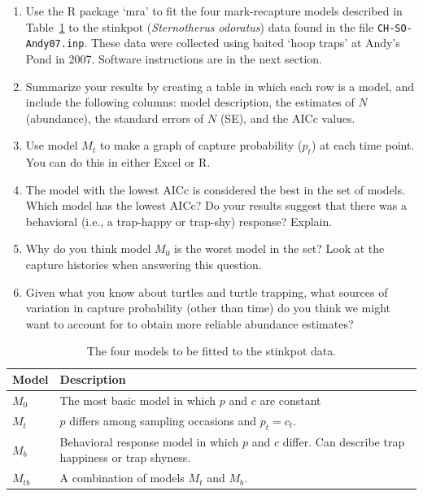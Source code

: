 \documentclass[12pt]{article}\usepackage[]{graphicx}\usepackage[]{color}
\begin{document}
\begin{enumerate}
  \item Use the R package `mra' to fit the four
    mark-recapture models described in Table~\ref{tab:Otis} to the
    stinkpot ({\it Sternotherus odoratus}) data found in the file
    \texttt{CH-SO-Andy07.inp}. These data were collected using baited
    `hoop traps' at Andy's Pond in 2007. Software instructions are in
    the next section. 
  \item Summarize your results by creating a table in which each row
    is a model, and include the following columns: model description,
    the estimates of $N$ (abundance), the standard errors of $N$ (SE),
    and the AICc values.
  \item Use model $M_t$ to make a graph of capture probability ($p_t$)
    at each time point. You can do this in either Excel or R.
  \item The model with the lowest AICc is considered the best in
    the set of models. Which model has the lowest AICc? Do your
    results suggest that %
    there was a behavioral (i.e., a trap-happy or
    trap-shy) response? Explain.
  \item Why do you think model $M_0$ is the worst model
    in the set? Look at the capture histories when answering this
    question. 
  \item Given what you know about turtles and turtle trapping,
    what sources of variation in capture probability (other than time)
    do you think we might want to account for to obtain more reliable
    abundance estimates?
\end{enumerate}

\clearpage

\begin{table}[h!]
  \centering
  \caption{The four models to be fitted to the stinkpot data.}
  \begin{tabular}[h!]{lp{5in}}
    \hline
    Model & Description \\
    \hline
    $M_0$ & The most basic model in which $p$ and $c$ are constant \\
    $M_t$ & $p$ differs among sampling occasions and $p_t=c_t$. \\
    $M_b$ & Behavioral response model in which $p$ and $c$
            differ. Can describe trap happiness or trap shyness. \\
    $M_{tb}$ & A combination of models $M_t$ and $M_b$. \\
    \hline
  \end{tabular}
  \label{tab:Otis}
\end{table}
\end{document}
